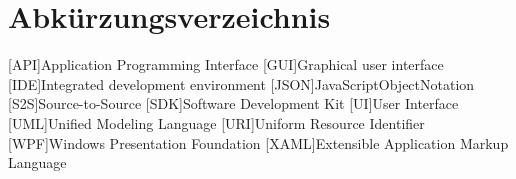 \chapter{Abkürzungsverzeichnis}
\begin{acronym}[XAML]
[API]{Application Programming Interface}
[GUI]{Graphical user interface}
[IDE]{Integrated development environment}
[JSON]{JavaScriptObjectNotation}
[S2S]{Source-to-Source}
[SDK]{Software Development Kit}
[UI]{User Interface}
[UML]{Unified Modeling Language}
[URI]{Uniform Resource Identifier}
[WPF]{Windows Presentation Foundation}
[XAML]{Extensible Application Markup Language}

\end{acronym}